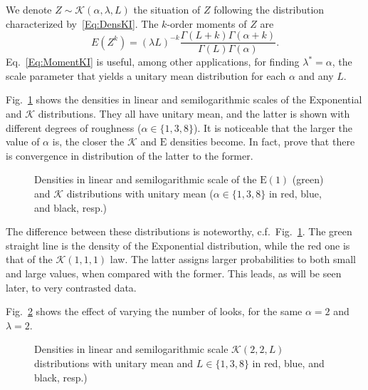 We denote $Z\sim \mathcal K(\alpha,\lambda,L)$ the situation of $Z$ following the distribution characterized by~\eqref{Eq:DensKI}.
The $k$-order moments of $Z$ are
\begin{equation}
E(Z^k) = (\lambda L)^{-k} \frac{\Gamma(L+k)\Gamma(\alpha+k)}{\Gamma(L)\Gamma(\alpha)}.
\label{Eq:MomentKI}
\end{equation}
Eq.~\eqref{Eq:MomentKI} is useful, among other applications, for finding $\lambda^*=\alpha$, the scale parameter that yields a unitary mean distribution for each $\alpha$ and any $L$.

Fig.~\ref{Fig:KIDistribution} shows the densities in linear and semilogarithmic scales of the Exponential and $\mathcal K$ distributions.
They all have unitary mean, and the latter is shown with different degrees of roughness ($\alpha\in\{1,3,8\}$).
It is noticeable that the larger the value of $\alpha$ is, the closer the $\mathcal K$ and $\text{E}$ densities become.
In fact, \citet{frery96} prove that there is convergence in distribution of the latter to the former.

\begin{figure}[hbt]
\centering
{}
\caption[Densities in linear and semilogarithmic scale of the $\text{E}(1)$ (green) and $\mathcal K$ distributions]{Densities in linear and semilogarithmic scale of the $\text{E}(1)$ (green) and $\mathcal K$ distributions with unitary mean ($\alpha\in\{1,3,8\}$ in red, blue, and black, resp.)}\label{Fig:KIDistribution}
\end{figure}

The difference between these distributions is noteworthy, c.f.\ Fig.~\ref{Fig:KIDistribution}.
The green straight line is the density of the Exponential distribution, while the red one is that of the $\mathcal K(1,1,1)$ law.
The latter assigns larger probabilities to both small and large values, when compared with the former.
This leads, as will be seen later, to very contrasted data.

Fig.~\ref{Fig:KIDistributionLooks} shows the effect of varying the number of looks, for the same $\alpha=2$ and $\lambda=2$.

\begin{figure}[hbt]
\centering
{}
\caption[Densities in linear and semilogarithmic scale $\mathcal K(2,2,L)$ distributions with unitary mean and $L\in\{1,3,8\}$]{Densities in linear and semilogarithmic scale $\mathcal K(2,2,L)$ distributions with unitary mean and $L\in\{1,3,8\}$ in red, blue, and black, resp.)}\label{Fig:KIDistributionLooks}
\end{figure}

